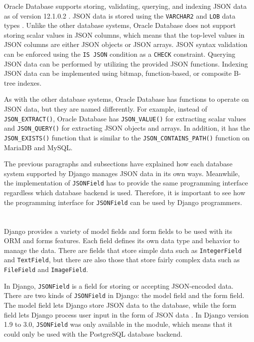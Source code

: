Oracle Database supports storing, validating, querying, and indexing JSON data
as of version 12.1.0.2 \cite{oracle:12.1.0.2}. JSON data is stored using the
\verb|VARCHAR2| and \verb|LOB| data types \cite{oracle:json}. Unlike the other
database systems, Oracle Database does not support storing scalar values in
JSON columns, which means that the top-level values in JSON columns are either
JSON objects or JSON arrays. JSON syntax validation can be enforced using the
\verb|IS JSON| condition as a \verb|CHECK| constraint. Querying JSON data can
be performed by utilizing the provided JSON functions. Indexing JSON data can
be implemented using bitmap, function-based, or composite B-tree indexes.

As with the other database systems, Oracle Database has functions to operate on
JSON data, but they are named differently. For example, instead of
\verb|JSON_EXTRACT()|, Oracle Database has \verb|JSON_VALUE()| for extracting
scalar values and \verb|JSON_QUERY()| for extracting JSON objects and arrays.
In addition, it has the \verb|JSON_EXISTS()| function that is similar to the
\verb|JSON_CONTAINS_PATH()| function on MariaDB and MySQL.

The previous paragraphs and subsections have explained how each database
system supported by Django manages JSON data in its own ways. Meanwhile, the
implementation of \verb|JSONField| has to provide the same programming
interface regardless which database backend is used. Therefore, it is important
to see how the programming interface for \verb|JSONField| can be used by Django
programmers.

\section{}

Django provides a variety of model fields and form fields to be used with its
ORM and forms features. Each field defines its own data type and behavior to
manage the data. There are fields that store simple data such as
\verb|IntegerField| and \verb|TextField|, but there are also those that store
fairly complex data such as \verb|FileField| and \verb|ImageField|.

In Django, \verb|JSONField| is a field for storing or accepting JSON-encoded
data. There are two kinds of \verb|JSONField| in Django: the model field and
the form field. The model field lets Django store JSON data to the database,
while the form field lets Django process user input in the form of JSON data
\cite{django30_modeljsonfield, django30_formjsonfield}. In Django version
1.9 to 3.0, \verb|JSONField| was only available in the
 module, which means that it could only be used
with the PostgreSQL database backend.

